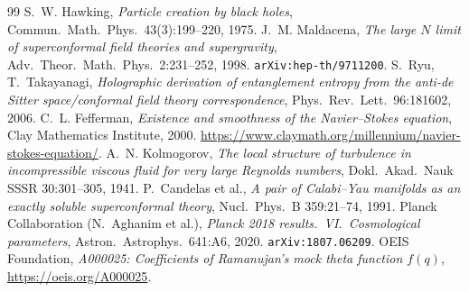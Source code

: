 \documentclass[11pt,a4paper]{article}
\theoremstyle{plain}
\theoremstyle{definition}
\begin{document}
\begin{thebibliography}{99}
 S.~W. Hawking, \emph{Particle creation by black holes}, Commun.\ Math.\ Phys.\ 43(3):199--220, 1975.
 J.~M. Maldacena, \emph{The large $N$ limit of superconformal field theories and supergravity}, Adv.\ Theor.\ Math.\ Phys.\ 2:231--252, 1998. \texttt{arXiv:hep-th/9711200}.
 S.~Ryu, T.~Takayanagi, \emph{Holographic derivation of entanglement entropy from the anti-de Sitter space/conformal field theory correspondence}, Phys.\ Rev.\ Lett.\ 96:181602, 2006.
 C.~L. Fefferman, \emph{Existence and smoothness of the Navier--Stokes equation}, Clay Mathematics Institute, 2000. \url{https://www.claymath.org/millennium/navier-stokes-equation/}.
 A.~N. Kolmogorov, \emph{The local structure of turbulence in incompressible viscous fluid for very large Reynolds numbers}, Dokl.\ Akad.\ Nauk SSSR 30:301--305, 1941.
 P.~Candelas et al., \emph{A pair of Calabi--Yau manifolds as an exactly soluble superconformal theory}, Nucl.\ Phys.\ B 359:21--74, 1991.
 Planck Collaboration (N.~Aghanim et al.), \emph{Planck 2018 results.\ VI.\ Cosmological parameters}, Astron.\ Astrophys.\ 641:A6, 2020. \texttt{arXiv:1807.06209}.
 OEIS Foundation, \emph{A000025: Coefficients of Ramanujan's mock theta function $f(q)$}, \url{https://oeis.org/A000025}.
\end{thebibliography}
\end{document}
